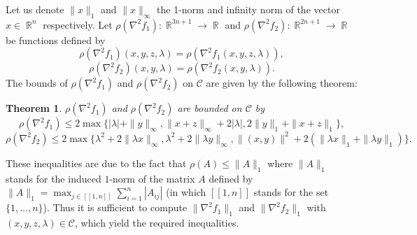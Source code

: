 \documentclass[3p]{elsarticle}
\DeclareMathOperator{\R}{\mathbb{R}}
\newcommand{\IntEnt}[1]{\left[\!\left[#1\right]\!\right]}
\newtheorem{thm}{Theorem}
\begin{document}
Let us denote $\|x\|_1$ and $\|x\|_{\infty}$ the 1-norm and infinity norm of the vector $x\in \R^n$ respectively. Let $\rho(\nabla^2 f_1):\R^{3n+1}\to \R$ and $\rho(\nabla^2 f_2):\R^{2n+1}\to \R$ be functions defined by
$$\rho(\nabla^2 f_1)(x,y,z,\lambda) = \rho(\nabla^2 f_1(x,y,z,\lambda)),$$ $$\rho(\nabla^2 f_2)(x,y,\lambda) = \rho(\nabla^2 f_2(x,y,\lambda)).$$
The bounds of $\rho (\nabla^2 f_1)$ and $\rho (\nabla^2 f_2)$ on $\mathcal{C}$ are given by the following theorem:
\begin{thm} \label{thm:specoff1&f2}
	$\rho (\nabla^2 f_1)$ and $\rho (\nabla^2 f_2)$ are bounded on $\mathcal{C}$ by 
	$$\rho (\nabla^2 f_1) \leq 2 \max\{|\lambda| + \|y\|_{\infty}, \|x+z\|_{\infty}+2|\lambda|, 2\|y\|_1 + \|x+z\|_{1}\},$$
	$$\rho (\nabla^2 f_2) \leq 2 \max\{\lambda^2+2\|\lambda x\|_{\infty}, \lambda^2+2\|\lambda y\|_{\infty}, \|(x,y)\|^2 + 2(\|\lambda x\|_1 + \|\lambda y\|_1) \}.$$
\end{thm}
\begin{pf}
	These inequalities are due to the fact that $\rho(A)\leq \|A\|_1$ where $\|A\|_1$ stands for the induced $1$-norm of the matrix $A$ defined by $\|A\|_1 = \max_{j\in \IntEnt{1,n}}\sum_{i=1}^{n}|A_{ij}|$ (in which $\IntEnt{1,n}$ stands for the set $\{1,\ldots, n\}$). Thus it is sufficient to compute $\|\nabla^2 f_1\|_1$ and $\|\nabla^2 f_2\|_1$ with $(x,y,z,\lambda)\in\mathcal{C}$, which yield the required inequalities.
\end{pf}
\end{document}

